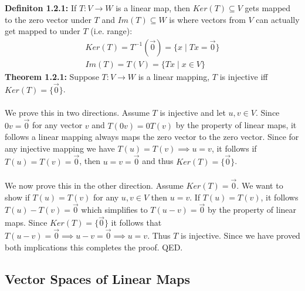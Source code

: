 \documentclass[11pt]{article}
\begin{document}
\textbf{Definiton 1.2.1:} If $T : V \rightarrow W$ is a linear map, then $Ker(T) \subseteq V$ gets mapped to the zero vector under $T$ and $Im(T) \subseteq W$ is where vectors from $V$ can actually get mapped to under $T$ (i.e. range):
\begin{gather*}
    Ker(T) = T^{-1}(\vec{0}) = \{x \; | \; Tx = \vec{0}\} \\
    Im(T) = T(V) = \{Tx \; | \; x \in V\}
\end{gather*}
\textbf{Theorem 1.2.1:} Suppose $T : V \rightarrow W$ is a linear mapping, $T$ is injective iff $Ker(T) = \{\vec{0}\}$. \\ 
\vspace{0.1cm} \\
We prove this in two directions. Assume $T$ is injective and let $u,v \in V$. Since $0v = \vec{0}$ for any vector $v$ and $T(0v) = 0T(v)$ by the property of linear maps, it follows a linear mapping always maps the zero vector to the zero vector. Since for any injective mapping we have $T(u) = T(v) \implies u = v$, it follows if $T(u) = T(v) = \vec{0}$, then $u = v = \vec{0}$ and thus $Ker(T) = \{\vec{0}\}$. \\
\vspace{0.1cm} \\
We now prove this in the other direction. Assume $Ker(T) = \vec{0}$. We want to show if $T(u) = T(v)$ for any $u,v \in V$ then $u = v$. If $T(u) = T(v)$, it follows $T(u) - T(v) = \vec{0}$ which simplifies to $T(u - v) = \vec{0}$ by the property of linear maps. Since $Ker(T) = \{\vec{0}\}$ it follows that $T(u - v) = \vec{0} \implies u - v = \vec{0} \implies u = v$. Thus $T$ is injective. Since we have proved both implications this completes the proof. QED.

\newpage

\subsection{Vector Spaces of Linear Maps}
\end{document}
